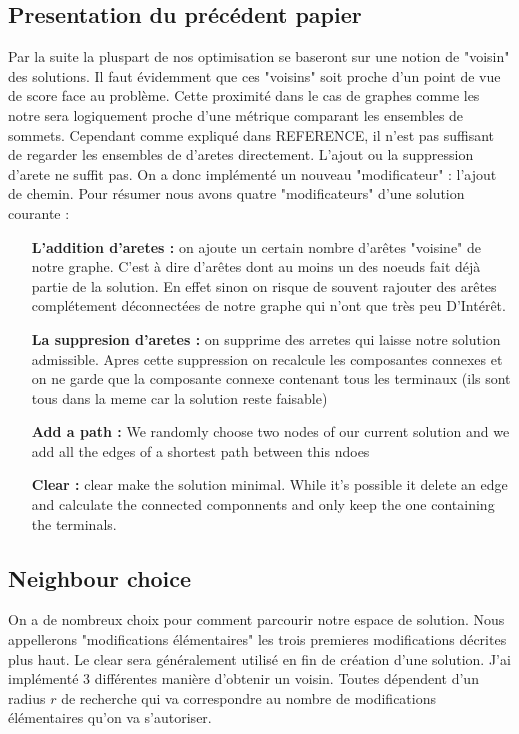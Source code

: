 \documentclass[10pt,a4paper]{article}
\begin{document}
\subsection{Presentation du précédent papier}
Par la suite la pluspart de nos optimisation se baseront sur une notion de "voisin" des solutions. Il faut évidemment que ces "voisins" soit proche d'un point de vue de score face au problème. Cette proximité dans le cas de graphes comme les notre sera logiquement proche d'une métrique comparant les ensembles de sommets. Cependant comme expliqué dans REFERENCE, il n'est pas suffisant de regarder les ensembles de d'aretes directement. L'ajout ou la suppression d'arete ne suffit pas. On a donc implémenté un nouveau "modificateur" : l'ajout de chemin. 
Pour résumer nous avons quatre "modificateurs" d'une solution courante :
\begin{itemize}   
\item[\textbf{L'addition  d'aretes : }] on ajoute un certain nombre d'arêtes "voisine" de notre graphe. C'est à dire d'arêtes dont au moins un des noeuds fait déjà partie de la solution. En effet sinon on risque de souvent rajouter des arêtes complétement déconnectées de notre graphe qui n'ont que très peu D’Intérêt.
\item[\textbf{La suppresion d'aretes : }] on supprime des arretes qui laisse notre solution admissible. Apres cette suppression on recalcule les composantes connexes et on ne garde que la composante connexe contenant tous les terminaux (ils sont tous dans la meme car la solution reste faisable)
\item[\textbf{Add a path : }] We randomly choose two nodes of our current solution and we add all the edges of a shortest path between this ndoes
\item[\textbf{Clear : }] clear make the solution minimal. While it's possible it delete an edge and calculate the connected componnents and only keep the one containing the terminals.
\end{itemize}

\subsection{Neighbour choice}

On a de nombreux choix pour comment parcourir notre espace de solution. Nous appellerons "modifications élémentaires" les trois premieres modifications décrites plus haut. Le clear sera généralement utilisé en fin de création d'une solution. J'ai implémenté 3 différentes manière d'obtenir un voisin. Toutes dépendent d'un radius $ r$ de recherche qui va correspondre au nombre de modifications élémentaires qu'on va s'autoriser. 
\end{document}
